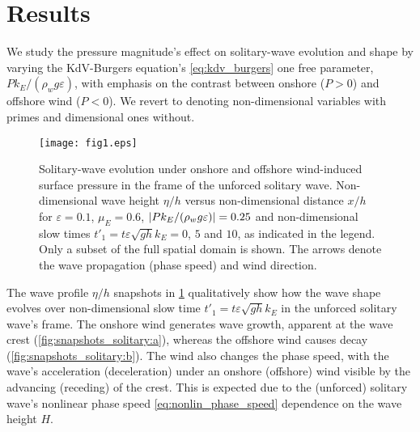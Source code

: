 \documentclass{jfm}
\renewcommand*{\epsilon}{\varepsilon}
\begin{document}
\section{\label{sec:results} Results}
We study the pressure magnitude's effect on solitary-wave evolution and
shape by varying the KdV-Burgers equation's \cref{eq:kdv_burgers} one
free parameter, $P k_E/(\rho_w g \epsilon)$, with emphasis on the
contrast between onshore ($P > 0$) and offshore wind ($P < 0$).
We revert to denoting non-dimensional variables with primes and
dimensional ones without.

\begin{figure}
  \centering
  { %
    \label{fig:snapshots_solitary:a}
    \label{fig:snapshots_solitary:b}
  }
  \texttt{[image: fig1.eps]}
  \caption{
    Solitary-wave evolution under
    onshore and
    offshore wind-induced surface pressure in the frame of the unforced
    solitary wave.
    Non-dimensional wave height $\eta/h$ versus
    non-dimensional distance $x/h$ for $\epsilon=0.1$,
    $\mu_E = 0.6$, $\abs{P k_E/(\rho_w g \epsilon)} = 0.25$ and
    non-dimensional slow times $t'_1 = t \epsilon \sqrt{gh} k_E = 0$,
    $5$ and $10$, as indicated in the legend.
    Only a subset of the full spatial domain is shown.
    The arrows denote the wave propagation (phase speed) and wind
    direction.
  }\label{fig:snapshots_solitary}
\end{figure}

The wave profile $\eta/h$ snapshots in \cref{fig:snapshots_solitary}
qualitatively show how the wave shape evolves over non-dimensional slow
time $t'_1 = t \epsilon \sqrt{g h} k_E$ in the unforced solitary wave's
frame.
The onshore wind generates wave growth, apparent at the wave
crest (\cref{fig:snapshots_solitary:a}), whereas the offshore wind causes
decay (\cref{fig:snapshots_solitary:b}).
The wind also changes the phase speed, with the wave's acceleration
(deceleration) under an onshore (offshore) wind visible by the advancing
(receding) of the crest.
This is expected due to the (unforced) solitary wave's
nonlinear phase speed \cref{eq:nonlin_phase_speed} dependence on the
wave height $H$.
\end{document}
